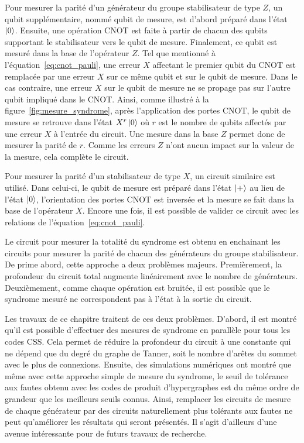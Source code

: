 Pour mesurer la parité d'un générateur du groupe stabilisateur de type $Z$,
un qubit supplémentaire, nommé qubit de mesure,
est d'abord préparé dans l'état $\ket 0$.
Ensuite,
une opération CNOT est faite à partir de chacun des qubits supportant le stabilisateur
vers le qubit de mesure.
Finalement,
ce qubit est mesuré dans la base de l'opérateur $Z$.
Tel que mentionné à l'équation~\ref{eq:cnot_pauli},
une erreur $X$ affectant le premier qubit du CNOT est remplacée
par une erreur $X$ sur ce même qubit et sur le qubit de mesure.
Dans le cas contraire,
une erreur $X$ sur le qubit de mesure ne se propage pas sur l'autre qubit 
impliqué dans le CNOT.
Ainsi,
comme illustré à la figure~\ref{fig:mesure_syndrome},
après l'application des portes CNOT,
le qubit de mesure se retrouve dans l'état $X^r\ket{0}$ où 
$r$ est le nombre de qubits affectés par une erreur $X$ à l'entrée du circuit.
Une mesure dans la base $Z$ permet donc de mesurer la parité de $r$.
Comme les erreurs $Z$ n'ont aucun impact sur la valeur de la mesure,
cela complète le circuit.

Pour mesurer la parité d'un stabilisateur de type $X$,
un circuit similaire est utilisé.
Dans celui-ci,
le qubit de mesure est préparé dans l'état $\ket +$ au lieu de l'état $\ket 0$,
l'orientation des portes CNOT est inversée
et la mesure se fait dans la base de l'opérateur $X$.
Encore une fois,
il est possible de valider ce circuit avec les relations de l'équation~\ref{eq:cnot_pauli}.

Le circuit pour mesurer la totalité du syndrome est obtenu 
en enchainant les circuits pour mesurer la parité de chacun des
générateurs du groupe stabilisateur.
De prime abord,
cette approche a deux problèmes majeurs.
Premièrement,
la profondeur du circuit total augmente linéairement avec le nombre 
de générateurs.
Deuxièmement,
comme chaque opération est bruitée,
il est possible que le syndrome mesuré ne correspondent pas à l'état à la sortie 
du circuit.

Les travaux de ce chapitre traitent de ces deux problèmes.
D'abord,
il est montré qu'il est possible d'effectuer des mesures de syndrome en parallèle
pour tous les codes CSS.
Cela permet de réduire la profondeur du circuit à une constante qui ne dépend que
du degré du graphe de Tanner,
soit le nombre d'arêtes du sommet avec le plus de connexions.
Ensuite,
des simulations numériques ont montré que même avec cette approche simple
de mesure du syndrome,
le seuil de tolérance aux fautes obtenu avec les codes de produit d'hypergraphes
est du même ordre de grandeur que les meilleurs seuils connus.
Ainsi,
remplacer les circuits de mesure de chaque générateur par des circuits
naturellement plus tolérants aux fautes ne peut qu'améliorer les résultats qui seront présentés.
Il s'agit d'ailleurs d'une avenue intéressante pour de futurs travaux de recherche.

